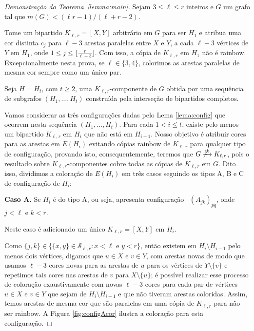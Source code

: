 \documentclass[12pt,a4paper]{book}
\newcommand{\K}{K_{\ell,r}} %
\newcommand{\Slr}{\mathcal{S}_{\ell,r}} %
\def\rbarrow{\xrightarrow[]{\raisebox{0.0mm}[0mm]{$\scriptstyle \rm rb$}}}
\begin{document}
    \begin{proof}[Demonstração do Teorema~\ref{lemma:main}]
      Sejam $3 \leq \ell \leq r$ inteiros e $G$ um grafo tal que $m(G) < (\ell r - 1)/(\ell+r-2)$.
    
        Tome um bipartido $\K = [X,Y]$ arbitrário em $G$ para ser $H_1$ e atribua uma cor distinta $c_j$ para $\ell-3$ arestas paralelas entre $X$ e $Y$, a cada $\ell-3$ vértices de $Y$ em $H_1$, onde
        $1 \leq j \leq \lfloor \frac{r}{\ell-3}\rfloor$. 
        Com isso, a cópia de $\K$ em $H_1$ não é rainbow.
        Excepcionalmente nesta prova, se $\ell \in\{3,4\}$, colorimos as arestas paralelas de mesma cor sempre como um único par.

        Seja $H = H_t$, com $t \geq 2$, uma $\K$-componente de $G$ obtida por uma sequência de subgrafos $(H_1, \ldots, H_t)$ construída pela interseção de bipartidos completos.

         Vamos considerar as três configurações dadas pelo Lema \ref{lema:config} que ocorrem nesta sequência $(H_1, \ldots, H_t)$.
         Para cada $1 < i \leq t$, existe pelo menos um bipartido $\K$ em $H_{i}$ que não está em $H_{i-1}$.
         Nosso objetivo é atribuir cores para as arestas em $E(H_{i})$ evitando cópias rainbow de $\K$ para qualquer tipo de configuração, provando isto, consequentemente, teremos que $G \not\rbarrow\K$, pois o resultado sobre $\K$-componentes cobre todas as cópias de $\K$ em $G$.
         Dito isso, dividimos a coloração de $E(H_i)$ em três casos seguindo os tipos A, B e C de configuração de $H_i$:

         \medskip \textbf{Caso A.} Se $H_i$ é do tipo A, ou seja, apresenta configuração~ \hyperlink{HconfigA}{$(A_{jk})_{pq}$}, onde $j < \ell$ e $k < r$.
         
        Neste caso é adicionado um único $\K = [X,Y]$ em $H_i$.     

        Como $\{j,k\} \in \{\{x,y\} \in \Slr: x < \ell \text{ e } y < r\}$, então existem em $H_i \setminus H_{i-1}$ pelo menos dois vértices, digamos que $u\in X$ e $v\in Y$, com arestas novas de modo que 
        usamos $\ell-3$ cores novas para as arestas de $u$ para os vértices de $Y\setminus\{v\}$ e repetimos tais cores nas arestas de $v$ para $X\setminus\{u\}$; é possível realizar esse processo de coloração exaustivamente com novas $\ell-3$ cores para cada par de vértices $u\in X$ e $v\in Y$ que sejam de $H_i\setminus H_{i-1}$ e que não tiveram arestas coloridas.
        Assim, temos arestas de mesma cor que são paralelas em uma cópia de $\K$ para não ser rainbow.
        A Figura \ref{fig:configAcor} ilustra a coloração para esta configuração.


\end{proof}
\end{document}
